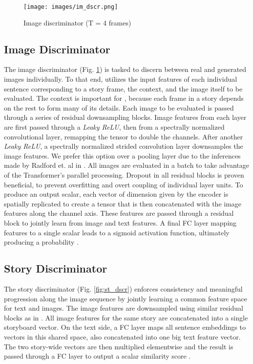 \documentclass{article}
\begin{document}
\begin{figure}[t]
\hspace{-0.2cm}
\texttt{[image: images/im\_dscr.png]}
\caption{Image discriminator  (T = 4 frames)}
\vspace{-0.2cm}
\label{fig:im_dscr}
\end{figure}

\subsection{Image Discriminator}
The image discriminator  (Fig. \ref{fig:im_dscr}) is tasked to discern between real and generated images individually. To that end,  utilizes the input features  of each individual sentence corresponding to a story frame, the context, and the image  itself to be evaluated. The context is important for , because each frame in a story depends on the rest to form many of its details. 
Each image to be evaluated is passed through a series of residual downsampling blocks. 
Image features from each layer are first passed through a \textit{Leaky ReLU}, then from a spectrally normalized convolutional layer, remapping the  tensor to double the channels. 
After another \textit{Leaky ReLU}, a spectrally normalized strided convolution layer downsamples the image features. 
We prefer this option over a pooling layer due to the inferences made by Radford et. al in \cite{radford2016unsupervised}. 
All images are evaluated in a batch to take advantage of the Transformer's parallel processing. Dropout in all  residual blocks is proven beneficial, 
to prevent overfitting and overt coupling of individual layer units. 
To produce an output scalar, each vector of dimension  given by the encoder is spatially replicated to create a 
 tensor that is then concatenated with the image features along the channel axis.  
These features are passed through a residual block to jointly learn from image and text features. A final FC layer mapping features to a single scalar leads to a sigmoid activation function, ultimately producing a probability .

\subsection{Story Discriminator}
The story discriminator  (Fig. \ref{fig:st_dscr}) enforces consistency and meaningful progression along the image sequence  by jointly learning a common feature space for text and images. The image features are downsampled using similar residual blocks as in . All image features for the same story are concatenated into a single storyboard vector. On the text side, a FC layer maps all sentence embeddings  to vectors in this shared space, also concatenated into one big text feature vector. The two story-wide vectors are then multiplied
elementwise and the result is passed through a FC layer to output a scalar similarity score .
\end{document}
